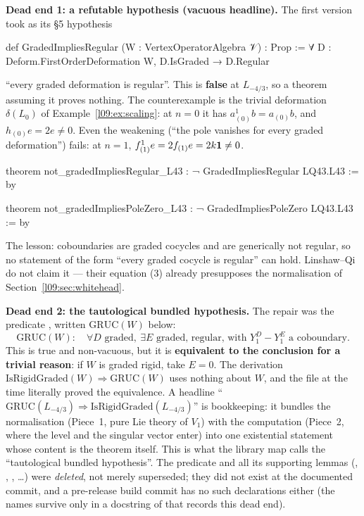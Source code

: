 \begin{warning}
\textbf{Dead end 1: a refutable hypothesis (vacuous headline).} The first version took as its \S5
hypothesis
\begin{leancode}
def GradedImpliesRegular (W : VertexOperatorAlgebra 𝒱) : Prop :=
  ∀ D : Deform.FirstOrderDeformation W, D.IsGraded → D.Regular
\end{leancode}
``every graded deformation is regular''. This is \textbf{false} at $L_{-4/3}$, so a theorem
assuming it proves nothing. The counterexample is the trivial deformation $\delta(L_0)$ of
Example~\ref{l09:ex:scaling}: at $n=0$ it has $a^1_{(0)}b = a_{(0)}b$, and $h_{(0)}e = 2e\ne0$. Even
the weakening  (``the pole vanishes for every graded deformation'')
fails: at $n=1$, $f^1_{(1)}e = 2f_{(1)}e = 2k\mathbf{1}\neq 0$.
\begin{leancode}
theorem not_gradedImpliesRegular_L43 : ¬ GradedImpliesRegular LQ43.L43 := by
\end{leancode}
\begin{leancode}
theorem not_gradedImpliesPoleZero_L43 : ¬ GradedImpliesPoleZero LQ43.L43 := by
\end{leancode}
The lesson: coboundaries are graded cocycles and are generically not regular, so no statement of
the form ``every graded cocycle is regular'' can hold. Linshaw--Qi do not claim it --- their
equation (3) already presupposes the normalisation of Section~\ref{l09:sec:whitehead}.
\end{warning}

\begin{warning}
\textbf{Dead end 2: the tautological bundled hypothesis.} The repair was
the predicate , written $\mathrm{GRUC}(W)$ below:
\begin{equation*}
  \mathrm{GRUC}(W):\quad \forall D \text{ graded},\ \exists E \text{ graded, regular, with }
  Y_1^D - Y_1^E \text{ a coboundary}.
\end{equation*}
This is true and non-vacuous, but it is \textbf{equivalent to the conclusion for a trivial reason}:
if $W$ is graded rigid, take $E = 0$. The derivation $\mathrm{IsRigidGraded}(W)\Rightarrow
\mathrm{GRUC}(W)$ uses nothing about $W$, and the file at the time literally
proved the equivalence. A headline ``$\mathrm{GRUC}(L_{-4/3}) \Rightarrow
\mathrm{IsRigidGraded}(L_{-4/3})$'' is bookkeeping: it bundles the normalisation (Piece~1, pure Lie
theory of $V_1$) with the computation (Piece~2, where the level and the singular vector enter) into
one existential statement whose content is the theorem itself. This is what the library map calls
the ``tautological bundled hypothesis''. The predicate and all its supporting lemmas
(, , , \ldots)
were \emph{deleted}, not merely superseded; they did not exist at the documented commit, and a pre-release build commit has
no such declarations either (the names survive only in a docstring of  that
records this dead end).
\end{warning}

